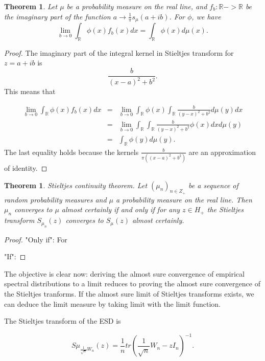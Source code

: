 \documentclass[12pt,a4paper,leqno]{report}
\newcommand{\R}{\mathbb{R}}
\theoremstyle{plain}
\newtheorem{theo}[equation]{Theorem}
\theoremstyle{definition}
\theoremstyle{remark}
\begin{document}
\begin{theo}
Let $\mu$ be a probability measure on the real line, and $f_b : \R -> \R$ be the imaginary part of the function $a  \to \frac{1}{\pi} s_{\mu}(a+ib)$.  For $\phi$, we have
\begin{equation*}
\lim_{b \to 0} \int_{\R} \phi(x) f_b (x) dx = \int_{\R} \phi(x) d\mu(x).
\end{equation*}
\end{theo}

\begin{proof}
The imaginary part of the integral kernel in Stieltjes transform for $z=a+ib$ is
\begin{equation*}
\frac{b}{(x-a)^2+b^2}.
\end{equation*}
This means that

\begin{eqnarray*}
\lim_{b \to 0} \int_{\R} \phi(x) f_b (x) dx & = & \lim_{b \to 0} \int_{\R} \phi(x) \int_{\R} \frac{b}{(y-x)^2+b^2} d\mu(y) dx\\
& = & \lim_{b \to 0} \int_{\R} \int_{\R} \frac{b}{(y-x)^2+b^2} \phi(x) dx d\mu(y)\\
& = & \int_{\R} \phi(y) d\mu(y).
\end{eqnarray*}
The last equality holds because the kernels $\frac{b}{\pi((x-a)^2+b^2)}$ are an approximation of identity.
\end{proof}

\begin{theo}
\emph{Stieltjes continuity theorem}. Let $(\mu_n)_{n \in Z_+}$ be a 
sequence of random probability measures and $\mu$ a probability measure on the real line. 
Then $\mu_n$ converges to $\mu$ almost certainly if and only if
for any $z \in H_+$ the Stieltjes transform $S_{\mu_n}(z)$ converges to $S_{\mu}(z)$ almost certainly.
\end{theo}

\begin{proof}
"Only if": For

"If":
\end{proof}

The objective is clear now: deriving the almost sure convergence of empirical spectral distributions to a limit reduces to proving the almost sure convergence of the Stieltjes tranforms.
If the almost sure limit of Stieltjes transforms exists, we can deduce the limit measure by taking limit with the limit function.

The Stieltjes transform of the ESD is

\begin{equation}
S\mu_{\frac{1}{\sqrt{n}}W_n}(z) = \frac{1}{n} tr(\frac{1}{\sqrt{n}}W_n - z I_n)^{-1}.
\end{equation}
\end{document}

